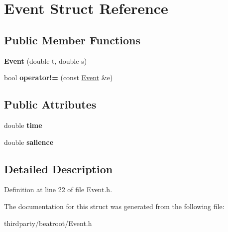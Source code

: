 \hypertarget{struct_event}{}\section{Event Struct Reference}
\label{struct_event}
\subsection*{Public Member Functions}
\begin{DoxyCompactItemize}
\item 
\mbox{\label{struct_event_adbee972b136040483b227da5f190dbc5}} 
{\bfseries Event} (double t, double s)
\item 
\mbox{\label{struct_event_ac8b9ba24e8af05111222a8e4fc1bf5cc}} 
bool {\bfseries operator!=} (const \hyperlink{struct_event}{Event} \&e)
\end{DoxyCompactItemize}
\subsection*{Public Attributes}
\begin{DoxyCompactItemize}
\item 
\mbox{\label{struct_event_a7cf2572f1124c9700c89ff9f01b311bf}} 
double {\bfseries time}
\item 
\mbox{\label{struct_event_af58b9314f158e0588b4b702d6ee94e7f}} 
double {\bfseries salience}
\end{DoxyCompactItemize}


\subsection{Detailed Description}


Definition at line 22 of file Event.\+h.



The documentation for this struct was generated from the following file\+:\begin{DoxyCompactItemize}
\item 
thirdparty/beatroot/Event.\+h\end{DoxyCompactItemize}
